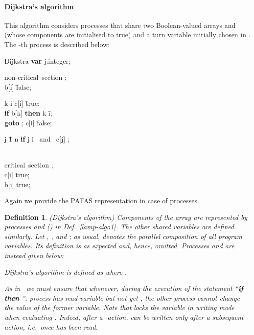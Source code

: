 \documentclass[copyright,creativecommons]{eptcs}
\newtheorem{definition}[theorem]{Definition}
\begin{document}
\paragraph{Dijkstra's algorithm}
This algorithm considers  processes that share two Boolean-valued
arrays  and  (whose components are initialised to true) and a turn
variable  initially chosen in . The -th process is described below:
\begin{algorithm}{Dijkstra}{}
{\bf var} \; j:integer;\\
\begin{WHILE}{}
\langle \mbox{non-critical section} \rangle; \\
b[i] \= false;\\
\begin{IF}{k \neq i}
c[i] \= true;\\
{\bf if} \; b[k] \; {\bf then} \; k \= i; \\
{\bf goto} ;
\ELSE 
c[i] \= false;\\
\begin{FOR}{j \= 1 \TO n}
{\bf if} \; j \neq i  \mbox{ and } \neg c[j]  ;
\end{FOR}
\end{IF}\\
\langle \mbox{critical section} \rangle; \\
c[i] \= true; \\
b[i] \= true;
\end{WHILE}
\end{algorithm}
\noindent Again we provide the PAFAS representation in case of 
processes.
\begin{definition}\rm\label{def:dijkstra1} ({\it Dijkstra's algorithm}) 
Components of the array  are represented by processes 
and  () in Def.~\ref{lamp-algo1}. The other shared
variables are defined similarly.
Let , , and ; as usual, 
 denotes the parallel composition of all
program variables. Its definition is as expected and, hence, omitted.
Processes  and  are instead given below:

\hspace{1cm}


\vspace{0.1cm}

\noindent Dijkstra's algorithm is defined as  where .

As in~\cite{Walker89} we must ensure that whenever, during the execution of
the statement ``{\bf if  then }'', process 
has read variable  but not yet , the other process cannot change
the value of the former variable. Note that  locks the variable  in
writing mode when evaluating . Indeed, after a -action,  can
be written only after a subsequent -action, i.e.\ once  has been
read.
\end{definition}
\end{document}
